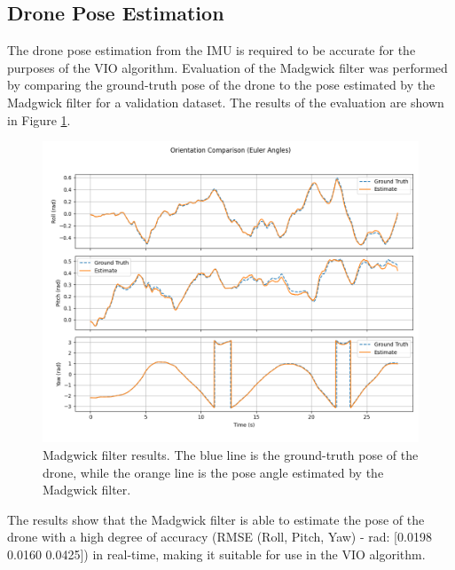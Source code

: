 \documentclass[bare_jrnl_transmag]{subfiles}
\begin{document}
\subsection{Drone Pose Estimation}
The drone pose estimation from the IMU is required to be accurate for the purposes of the VIO algorithm. Evaluation of the Madgwick filter was performed by comparing the ground-truth pose of the drone to the pose estimated by the Madgwick filter for a validation dataset. The results of the evaluation are shown in Figure \ref{fig:madgwick_results}.

\begin{figure}[H]
    \centering
    \includegraphics[width=0.8\linewidth]{figures/madgwick_results.png}
    \caption{Madgwick filter results. The blue line is the ground-truth pose of the drone, while the orange line is the pose angle estimated by the Madgwick filter.}
    \label{fig:madgwick_results}
\end{figure}

The results show that the Madgwick filter is able to estimate the pose of the drone with a high degree of accuracy (RMSE (Roll, Pitch, Yaw) - rad: [0.0198 0.0160 0.0425]) in real-time, making it suitable for use in the VIO algorithm.
\end{document}
